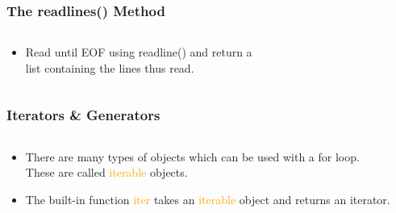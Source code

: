 \documentclass{beamer}
\begin{document}
\begin{frame}[fragile]
	\frametitle{The readlines() Method}
	\begin{columns}[c]
		\begin{column}{30cm}
			\vspace{.1cm}
			\begin{itemize}
				\item Read until EOF using readline() and return a \\
				 list containing the lines thus read.
			\end{itemize}
		\end{column}
	\end{columns}
\end{frame}

\begin{frame}[fragile]
	\frametitle{Iterators \& Generators}
	\begin{columns}[c]
		\begin{column}{30cm}
			\vspace{.1cm}
			\begin{itemize}
				\justifying
				\item There are many types of objects which can be used with a for loop.\\
				These are called \textcolor{orange}{iterable} objects.
				\item The built-in function \textcolor{orange}{iter} takes an \textcolor{orange}{iterable}
				object and returns an iterator.
			\end{itemize}
		\end{column}
	\end{columns}
\end{frame}
\end{document}
